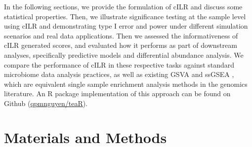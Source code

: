 \documentclass{article}
\begin{document}
In the following sections, we provide the formulation of cILR and discuss some statistical properties. Then, we illustrate significance testing at the sample level using cILR and demonstrating type I error and power under different simulation scenarios and real data applications. Then we assessed the informativeness of cILR generated scores, and evaluated how it performs as part of downstream analyses, specifically predictive models and differential abundance analysis. We compare the performance of cILR in these respective tasks against standard microbiome data analysis practices, as well as existing GSVA \cite{hanzelmann2013} and ssGSEA \cite{barbie2009}, which are equivalent single sample enrichment analysis methods in the genomics literature. An R package implementation of this approach can be found on Github (\href{www.github.com/qpmnguyen/teaR}{qpmnguyen/teaR}).

\section*{Materials and Methods} \label{Methods}
\end{document}
